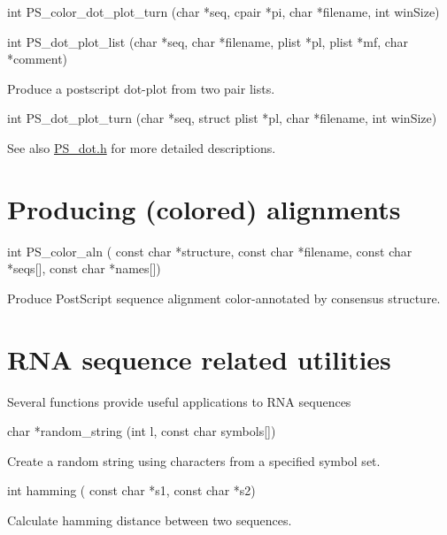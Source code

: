 \begin{DoxyVerb}int PS_color_dot_plot_turn (char *seq,
                            cpair *pi,
                            char *filename,
                            int winSize)
\end{DoxyVerb}


\begin{DoxyVerb}int PS_dot_plot_list (char *seq,
                      char *filename,
                      plist *pl,
                      plist *mf,
                      char *comment)
\end{DoxyVerb}
 Produce a postscript dot-\/plot from two pair lists.

\begin{DoxyVerb}int PS_dot_plot_turn (char *seq,
                      struct plist *pl,
                      char *filename,
                      int winSize)
\end{DoxyVerb}


\begin{DoxySeeAlso}{See also}
\mbox{\hyperlink{PS__dot_8h}{P\+S\+\_\+dot.\+h}} for more detailed descriptions.
\end{DoxySeeAlso}
\hypertarget{mp_utils_utils_aln}{}\section{Producing (colored) alignments}\label{mp_utils_utils_aln}
\begin{DoxyVerb}int PS_color_aln (
            const char *structure,
            const char *filename,
            const char *seqs[],
            const char *names[])
\end{DoxyVerb}
 Produce Post\+Script sequence alignment color-\/annotated by consensus structure.

\hypertarget{mp_utils_utils_seq}{}\section{R\+N\+A sequence related utilities}\label{mp_utils_utils_seq}
Several functions provide useful applications to R\+NA sequences

\begin{DoxyVerb}char  *random_string (int l,
                      const char symbols[])
\end{DoxyVerb}
 Create a random string using characters from a specified symbol set.

\begin{DoxyVerb}int   hamming ( const char *s1,
                const char *s2)
\end{DoxyVerb}
 Calculate hamming distance between two sequences.

